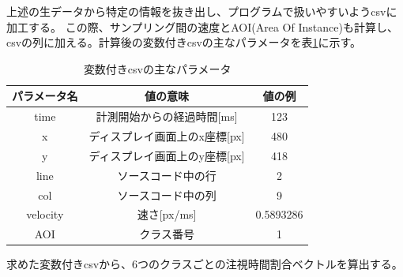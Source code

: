 \documentclass[paper=a4paper,fontsize=11pt]{jlreq}
\begin{document}
  上述の生データから特定の情報を抜き出し、プログラムで扱いやすいようcsvに加工する。
  この際、サンプリング間の速度とAOI(Area Of Instance)も計算し、csvの列に加える。計算後の変数付きcsvの主なパラメータを表\ref{csv_data}に示す。
  \begin{table}[h]
    \centering
    \caption{変数付きcsvの主なパラメータ}
    \begin{tabular}{|c|c|c|}
        \hline
        パラメータ名 & 値の意味 & 値の例 \\ \hline
        time & 計測開始からの経過時間[ms] & 123 \\ \hline
        x & ディスプレイ画面上のx座標[px] & 480 \\ \hline
        y & ディスプレイ画面上のy座標[px] & 418 \\ \hline
        line & ソースコード中の行 & 2 \\ \hline
        col & ソースコード中の列 & 9 \\ \hline
        velocity & 速さ[px/ms] & 0.5893286\\ \hline
        AOI & クラス番号 & 1\\ \hline
    \end{tabular}
    \label{csv_data}
  \end{table}
  \FloatBarrier


  求めた変数付きcsvから、6つのクラスごとの注視時間割合ベクトルを算出する。
  
\end{document}
